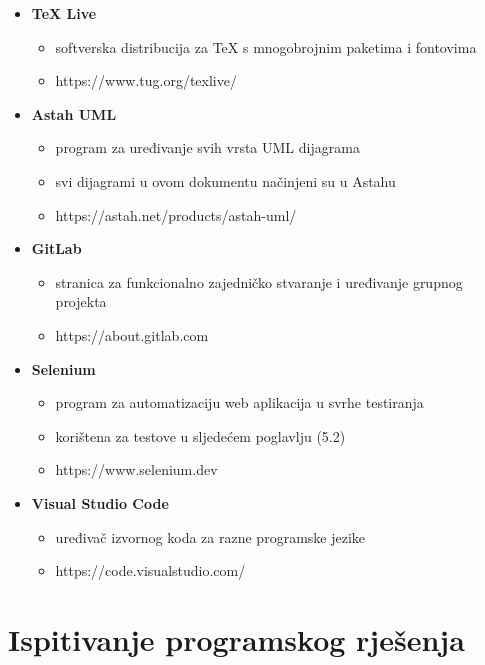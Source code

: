 \begin{itemize}
				\item \textbf{TeX Live}
				\begin{itemize}
					\item softverska distribucija za TeX s mnogobrojnim paketima i fontovima
					\item https://www.tug.org/texlive/
				\end{itemize}
			
				\item \textbf{Astah UML}
				\begin{itemize}
					\item program za uređivanje svih vrsta UML dijagrama
					\item svi dijagrami u ovom dokumentu načinjeni su u Astahu
					\item https://astah.net/products/astah-uml/
				\end{itemize}
			
				\item \textbf{GitLab}
				\begin{itemize}
					\item stranica za funkcionalno zajedničko stvaranje i uređivanje grupnog projekta
					\item https://about.gitlab.com
				\end{itemize}
			
				\item \textbf{Selenium}
				\begin{itemize}
					\item program za automatizaciju web aplikacija u svrhe testiranja
					\item korištena za testove u sljedećem poglavlju (5.2)
					\item https://www.selenium.dev
				\end{itemize}
			
				\item \textbf{Visual Studio Code}
				\begin{itemize}
					\item uređivač izvornog koda za razne programske jezike
					\item https://code.visualstudio.com/
				\end{itemize}
			\end{itemize}
			
			\eject 
		
	
		\section{Ispitivanje programskog rješenja}
			
